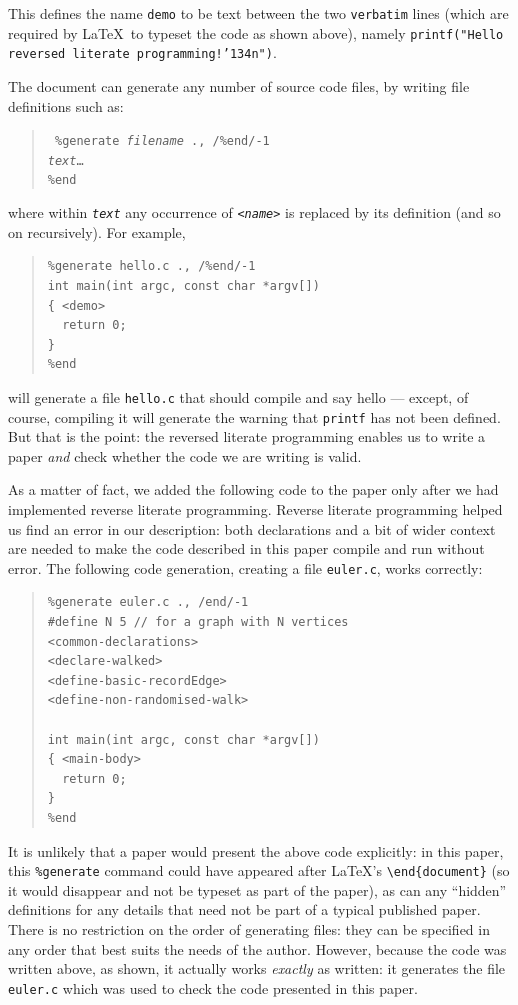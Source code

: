 \documentclass[12pt]{article}
\begin{document}
This defines the name \texttt{demo} to be text between the two \texttt{verbatim} lines (which are required by \LaTeX\ to typeset the code as shown above), namely \texttt{printf("Hello reversed literate programming!\char'134n")}.

The document can generate any number of source code files, by writing file definitions such as:

\begin{verse}\tt
\%{}generate \emph{filename} ., /\%end/-1\\
\emph{text}\ldots\\
\%end
\end{verse}

where within \texttt{\emph{text}} any occurrence of \texttt{<\emph{name}>} is replaced by its definition (and so on recursively). For example,

\begin{quote}\begin{verbatim}
%generate hello.c ., /%end/-1
int main(int argc, const char *argv[])
{ <demo>
  return 0;
}
%end
\end{verbatim}\end{quote}

will generate a file \texttt{hello.c} that should compile and say hello --- except, of course, compiling it will generate the warning that \texttt{printf} has not been defined. But that is the point: the reversed literate programming enables us to write a paper \emph{and\/} check whether the code we are writing is valid. 

As a matter of fact, we added the following code to the paper only after we had implemented reverse literate programming. Reverse literate programming helped us find an error in our description: both declarations and a bit of wider context are needed to make the code described in this paper compile and run without error. The following code generation, creating a file \texttt{euler.c}, works correctly:

\begin{quote}\begin{verbatim}
%generate euler.c ., /end/-1
#define N 5 // for a graph with N vertices
<common-declarations>
<declare-walked>
<define-basic-recordEdge>
<define-non-randomised-walk>

int main(int argc, const char *argv[])
{ <main-body>
  return 0;
}
%end
\end{verbatim}\end{quote}

It is unlikely that a paper would present the above code explicitly: in this paper, this \texttt{\%{}generate} command could have appeared after \LaTeX's \verb|\end{document}| (so it would disappear and not be typeset as part of the paper), as can any ``hidden'' definitions for any details that need not be part of a typical published paper. There is no restriction on the order of generating files: they can be specified in any order that best suits the needs of the author. However, because the code was written above, as shown, it actually works \emph{exactly\/} as written: it generates the file \texttt{euler.c} which was used to check the code presented in this paper. 
\end{document}
